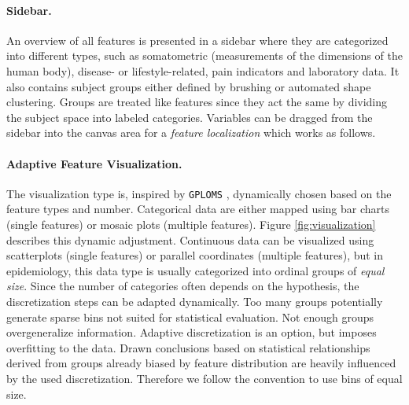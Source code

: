 \documentclass[journal]{style/vgtc} 			          %
\begin{document}
\paragraph{Sidebar.}
An overview of all features is presented in a sidebar where they are categorized into different types, such as somatometric (measurements of the dimensions of the human body), disease- or lifestyle-related, pain indicators and laboratory data.
%
It also contains subject groups either defined by brushing or automated shape clustering.
%
Groups are treated like features since they act the same by dividing the subject space into labeled categories.
%
Variables can be dragged from the sidebar into the canvas area for a \emph{feature localization} which works as follows.
%

\paragraph{Adaptive Feature Visualization.} \label{sec:AdaptiveFeatureVisualization}
The visualization type is, inspired by \texttt{GPLOMS} \cite{Francois2013}, dynamically chosen based on the feature types and number.
%
Categorical data are either mapped using bar charts (single features) or mosaic plots (multiple features).
%
Figure \ref{fig:visualization} describes this dynamic adjustment.
%
Continuous data can be visualized using scatterplots (single features) or parallel coordinates (multiple features), but in epidemiology, this data type is usually categorized into ordinal groups of \emph{equal size}.
%
Since the number of categories often depends on the hypothesis, the discretization steps can be adapted dynamically.
%
Too many groups potentially generate sparse bins not suited for statistical evaluation. 
%
Not enough groups overgeneralize information.
%
Adaptive discretization is an option, but imposes overfitting to the data.
%
Drawn conclusions based on statistical relationships derived from groups already biased by feature distribution are heavily influenced by the used discretization.
%
Therefore we follow the convention to use bins of equal size. 
\end{document}
